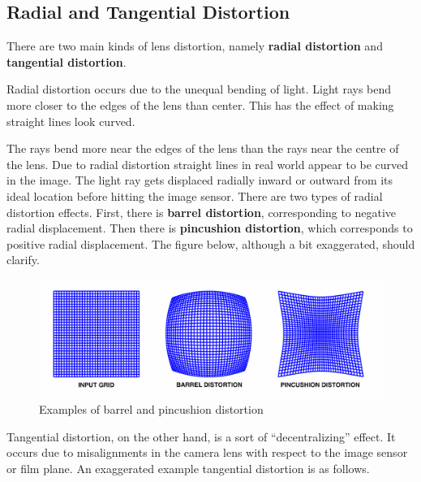 \documentclass{article}
\begin{document}
\subsection{Radial and Tangential Distortion}

There are two main kinds of lens distortion, namely \textbf{radial distortion} and \textbf{tangential distortion}. 

Radial distortion occurs due to the unequal bending of light. Light rays bend more closer to the edges of the lens than center. This has the effect of making straight lines look curved. 

The rays bend more near the edges of the lens than the rays near the centre of the lens. Due to radial distortion straight lines in real world appear to be curved in the image. The light ray gets displaced radially inward or outward from its ideal location before hitting the image sensor. There are two types of radial distortion effects. First, there is \textbf{barrel distortion}, corresponding to negative radial displacement. Then there is \textbf{pincushion distortion}, which corresponds to positive radial displacement. The figure below, although a bit exaggerated, should clarify.

\newpage 
\begin{figure}[h]
\centering
\includegraphics[scale=0.37]{Distortion.png}
\caption{Examples of barrel and pincushion distortion}
\end{figure}

Tangential distortion, on the other hand, is a sort of ``decentralizing'' effect. It occurs due to misalignments in the camera lens with respect to the image sensor or film plane. An exaggerated example tangential distortion is as follows.
\end{document}
